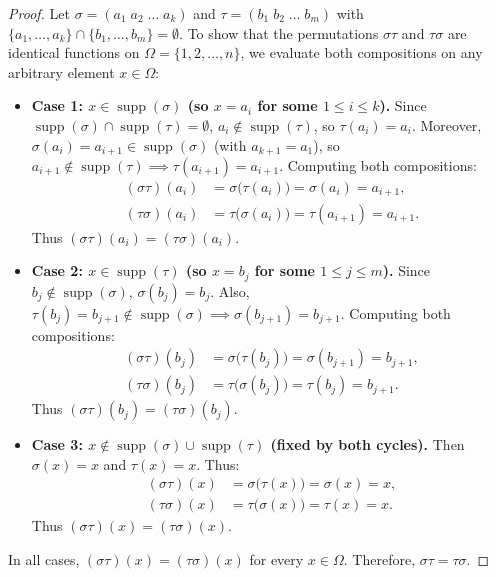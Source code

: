 \begin{proof}
Let $\sigma = (a_1 \; a_2 \; \dots \; a_k)$ and $\tau = (b_1 \; b_2 \; \dots \; b_m)$ with $\{a_1, \dots, a_k\} \cap \{b_1, \dots, b_m\} = \emptyset$.
To show that the permutations $\sigma\tau$ and $\tau\sigma$ are identical functions on $\Omega = \{1, 2, \dots, n\}$, we evaluate both compositions on any arbitrary element $x \in \Omega$:
\begin{itemize}[leftmargin=1.5em, itemsep=6pt]
    \item \textbf{Case 1: $x \in \operatorname{supp}(\sigma)$ (so $x = a_i$ for some $1 \le i \le k$).}
    Since $\operatorname{supp}(\sigma) \cap \operatorname{supp}(\tau) = \emptyset$, $a_i \notin \operatorname{supp}(\tau)$, so $\tau(a_i) = a_i$.
    Moreover, $\sigma(a_i) = a_{i+1} \in \operatorname{supp}(\sigma)$ (with $a_{k+1} = a_1$), so $a_{i+1} \notin \operatorname{supp}(\tau) \implies \tau(a_{i+1}) = a_{i+1}$.
    Computing both compositions:
    \begin{align*}
    (\sigma \tau)(a_i) &= \sigma\bigl(\tau(a_i)\bigr) = \sigma(a_i) = a_{i+1}, \\
    (\tau \sigma)(a_i) &= \tau\bigl(\sigma(a_i)\bigr) = \tau(a_{i+1}) = a_{i+1}.
    \end{align*}
    Thus $(\sigma \tau)(a_i) = (\tau \sigma)(a_i)$.

    \item \textbf{Case 2: $x \in \operatorname{supp}(\tau)$ (so $x = b_j$ for some $1 \le j \le m$).}
    Since $b_j \notin \operatorname{supp}(\sigma)$, $\sigma(b_j) = b_j$.
    Also, $\tau(b_j) = b_{j+1} \notin \operatorname{supp}(\sigma) \implies \sigma(b_{j+1}) = b_{j+1}$.
    Computing both compositions:
    \begin{align*}
    (\sigma \tau)(b_j) &= \sigma\bigl(\tau(b_j)\bigr) = \sigma(b_{j+1}) = b_{j+1}, \\
    (\tau \sigma)(b_j) &= \tau\bigl(\sigma(b_j)\bigr) = \tau(b_j) = b_{j+1}.
    \end{align*}
    Thus $(\sigma \tau)(b_j) = (\tau \sigma)(b_j)$.

    \item \textbf{Case 3: $x \notin \operatorname{supp}(\sigma) \cup \operatorname{supp}(\tau)$ (fixed by both cycles).}
    Then $\sigma(x) = x$ and $\tau(x) = x$. Thus:
    \begin{align*}
    (\sigma \tau)(x) &= \sigma\bigl(\tau(x)\bigr) = \sigma(x) = x, \\
    (\tau \sigma)(x) &= \tau\bigl(\sigma(x)\bigr) = \tau(x) = x.
    \end{align*}
    Thus $(\sigma \tau)(x) = (\tau \sigma)(x)$.
\end{itemize}
In all cases, $(\sigma \tau)(x) = (\tau \sigma)(x)$ for every $x \in \Omega$. Therefore, $\sigma \tau = \tau \sigma$.
\end{proof}


